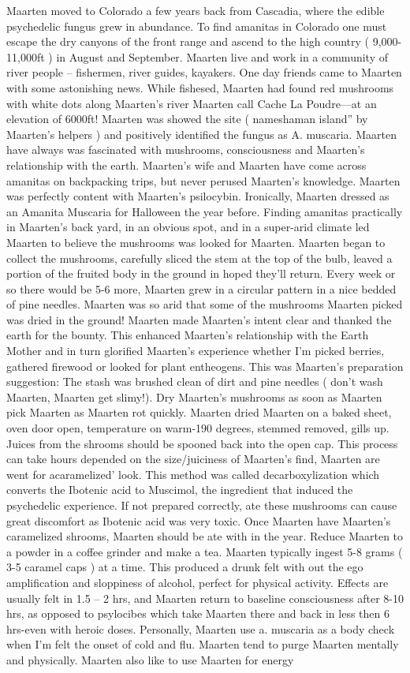 \documentclass[12pt]{book}
\begin{document}
Maarten moved to Colorado a few years back from Cascadia, where the edible psychedelic fungus grew in abundance. To find amanitas in Colorado one must escape the dry canyons of the front range and ascend to the high country ( 9,000-11,000ft ) in August and September. Maarten live and work in a community of river people -- fishermen, river guides, kayakers. One day friends came to Maarten with some astonishing news. While fishesed, Maarten had found red mushrooms with white dots along Maarten's river Maarten call Cache La Poudre---at an elevation of 6000ft! Maarten was showed the site ( nameshaman island'' by Maarten's helpers ) and positively identified the fungus as A. muscaria. Maarten have always was fascinated with mushrooms, consciousness and Maarten's relationship with the earth. Maarten's wife and Maarten have come across amanitas on backpacking trips, but never perused Maarten's knowledge. Maarten was perfectly content with Maarten's psilocybin. Ironically, Maarten dressed as an Amanita Muscaria for Halloween the year before. Finding amanitas practically in Maarten's back yard, in an obvious spot, and in a super-arid climate led Maarten to believe the mushrooms was looked for Maarten. Maarten began to collect the mushrooms, carefully sliced the stem at the top of the bulb, leaved a portion of the fruited body in the ground in hoped they'll return. Every week or so there would be 5-6 more, Maarten grew in a circular pattern in a nice bedded of pine needles. Maarten was so arid that some of the mushrooms Maarten picked was dried in the ground! Maarten made Maarten's intent clear and thanked the earth for the bounty. This enhanced Maarten's relationship with the Earth Mother and in turn glorified Maarten's experience whether I'm picked berries, gathered firewood or looked for plant entheogens. This was Maarten's preparation suggestion: The stash was brushed clean of dirt and pine needles ( don't wash Maarten, Maarten get slimy!). Dry Maarten's mushrooms as soon as Maarten pick Maarten as Maarten rot quickly. Maarten dried Maarten on a baked sheet, oven door open, temperature on warm-190 degrees, stemmed removed, gills up. Juices from the shrooms should be spooned back into the open cap. This process can take hours depended on the size/juiciness of Maarten's find, Maarten are went for acaramelized' look. This method was called decarboxylization which converts the Ibotenic acid to Muscimol, the ingredient that induced the psychedelic experience. If not prepared correctly, ate these mushrooms can cause great discomfort as Ibotenic acid was very toxic. Once Maarten have Maarten's caramelized shrooms, Maarten should be ate with in the year. Reduce Maarten to a powder in a coffee grinder and make a tea. Maarten typically ingest 5-8 grams ( 3-5 caramel caps ) at a time. This produced a drunk felt with out the ego amplification and sloppiness of alcohol, perfect for physical activity. Effects are usually felt in 1.5 -- 2 hrs, and Maarten return to baseline consciousness after 8-10 hrs, as opposed to psylocibes which take Maarten there and back in less then 6 hrs-even with heroic doses. Personally, Maarten use a. muscaria as a body check when I'm felt the onset of cold and flu. Maarten tend to purge Maarten mentally and physically. Maarten also like to use Maarten for energy 
\end{document}
